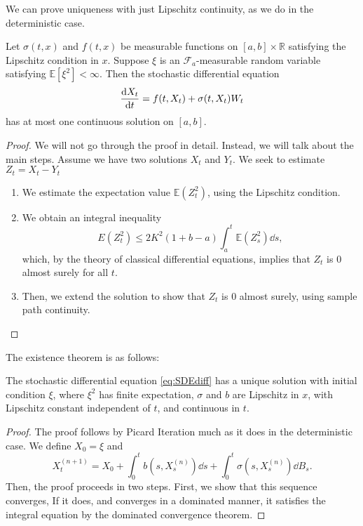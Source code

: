 \documentclass[prb,12pt]{revtex4-2}
\theoremstyle{definition}
\theoremstyle{definition}
\theoremstyle{definition}
\newcommand{\R}{\mathbb{R}}
\begin{document}
We can prove uniqueness with just Lipschitz continuity, as we do in the deterministic case.
\begin{Theorem}
	Let $\sigma(t,x)$ and $f(t,x)$ be measurable functions on $[a,b]\times \R$ satisfying the Lipschitz condition in $x$. Suppose $\xi$ is an $\mathcal{F}_a$-measurable random variable satisfying $\mathbb{E}[\xi^2]<\infty$. Then the stochastic differential equation
	\[\dv{X_t}{t}=f(t, X_t)+\sigma(t, X_t)W_t\]
	has at most one continuous solution on $[a,b]$.
\end{Theorem}
\begin{proof}
	We will not go through the proof in detail. Instead, we will talk about the main steps. Assume we have two solutions $X_t$ and $Y_t$. We seek to estimate $Z_t=X_t-Y_t$
	\begin{enumerate}
		\item We estimate the expectation value $\mathbb{E}(Z_t^2)$, using the Lipschitz condition.
		\item We obtain an integral inequality
			 \[
			 E(Z_t^2) \le 2K^2 (1+b-a)\int_a^t \mathbb{E}(Z_s^2)\dd{s}
			,\]
			which, by the theory of classical differential equations, implies that $Z_t$ is 0 almost surely for all $t$.
		\item Then, we extend the solution to show that $Z_t$ is $0$ almost surely, using sample path continuity.\qedhere
	\end{enumerate}
\end{proof}
The existence theorem is as follows:
\begin{Theorem}
	The stochastic differential equation \eqref{eq:SDEdiff} has a unique solution with initial condition $\xi$, where $\xi^2$ has finite expectation, $\sigma$ and $b$ are Lipschitz in $x$, with Lipschitz constant independent of $t$, and continuous in $t$.
\end{Theorem}
\begin{proof}
	The proof follows by Picard Iteration much as it does in the deterministic case. We define $X_0=\xi$ and
	\[
	X_t^{(n+1)}=X_0+\int_0^t b(s, X_s^{(n)})\dd{s}+\int_0^t \sigma(s, X_s^{(n)})\dd{B_s}
	.\] 
	Then, the proof proceeds in two steps. First, we show that this sequence converges, If it does, and converges in a dominated manner, it satisfies the integral equation by the dominated convergence theorem. 
\end{proof}
\end{document}
